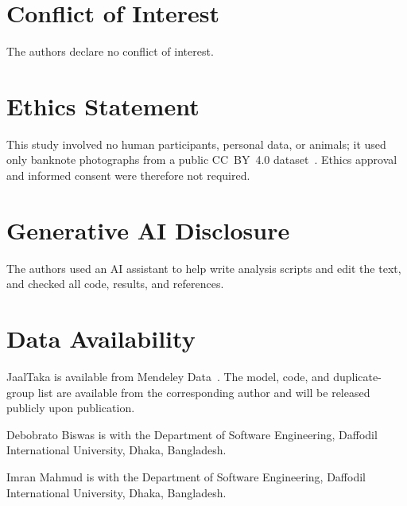 \documentclass[journal,onecolumn]{IEEEtran}
\begin{document}
\section*{Conflict of Interest}
The authors declare no conflict of interest.

\section*{Ethics Statement}
This study involved no human participants, personal data, or animals; it used only
banknote photographs from a public CC~BY~4.0 dataset~\cite{jaaltaka_data}. Ethics
approval and informed consent were therefore not required.

\section*{Generative AI Disclosure}
The authors used an AI assistant to help write analysis scripts and edit the text, and
checked all code, results, and references.

\section*{Data Availability}
JaalTaka is available from Mendeley Data~\cite{jaaltaka_data}. The model, code, and
duplicate-group list are available from the corresponding author and will be released
publicly upon publication.




\begin{IEEEbiographynophoto}{Debobrato Biswas}
is with the Department of Software Engineering, Daffodil International University,
Dhaka, Bangladesh. %
\end{IEEEbiographynophoto}

\begin{IEEEbiographynophoto}{Imran Mahmud}
is with the Department of Software Engineering, Daffodil International University,
Dhaka, Bangladesh. %
\end{IEEEbiographynophoto}
\end{document}
